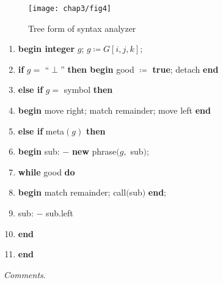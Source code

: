 \begin{figure}[ht!]
	\centering
	\texttt{[image: chap3/fig4]}
	\caption{Tree form of syntax analyzer}
	\label{fig:syntax-analyzer-1}
\end{figure}

\begin{enumerate}[nosep, label=\arabic*.]
	\item \textbf{begin integer} $g$; $g\coloneq G[i, j, k]$;
	\item \label{en:comment-label-2}
	\quad \textbf{if} $g =$ ``$\perp$'' \textbf{then begin} good $\coloneq$ \textbf{true}; detach \textbf{end}
	
	\item \quad \textbf{else if} $g =$ symbol \textbf{then}
	
	\item \label{en:comment-label-4}
	\quad \textbf{begin} move right; match remainder; move left \textbf{end}
	
	\item \quad \textbf{else if} meta$(g)$ \textbf{then}
	
	\item \label{en:comment-label-6}
	\quad \textbf{begin} sub: $-$ \textbf{new} phrase$(g,$ sub$)$;
	\item \quad \quad \textbf{while} good \textbf{do}
	
	\item \label{en:comment-label-8}
	\quad \quad \textbf{begin} match remainder; call$($sub$)$ \textbf{end};
	
	\item \label{en:comment-label-9}
	\quad \quad sub: $-$ sub.left
	
	\item \quad \quad \textbf{end}
	\item \quad \textbf{end}
\end{enumerate}

\noindent
\textit{Comments}.


